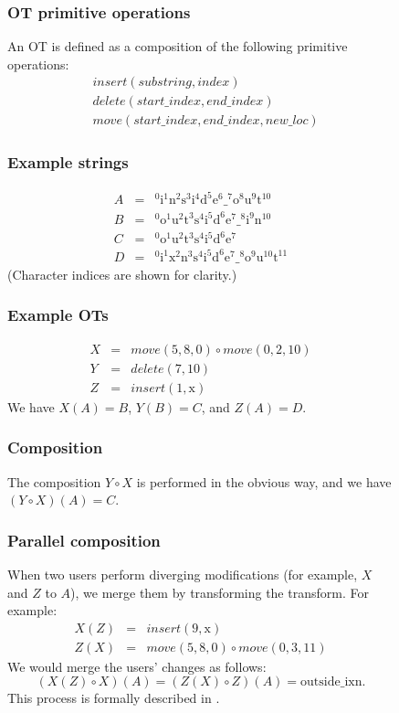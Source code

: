 \documentclass[11pt,titlepage]{article}
\begin{document}
\begin{figure}[h]
  \centering
  \begin{minipage}{\textwidth}
    \begin{multicols}{2}
      \setlength{\parskip}{-6pt}
      \subsubsection*{OT primitive operations}
      An OT is defined as a composition of the following primitive
      operations:
      \begin{eqnarray*}
        &insert(substring, index) \\
        &delete(start\_index, end\_index) \\
        &move(start\_index, end\_index, new\_loc)
      \end{eqnarray*}      
      \subsubsection*{Example strings}
      \begin{eqnarray*}
        A &=& \mathrm{^0i^1n^2s^3i^4d^5e^6\_^7o^8u^9t^{10}} \\
        B &=& \mathrm{^0o^1u^2t^3s^4i^5d^6e^7\_^8i^9n^{10}} \\
        C &=& \mathrm{^0o^1u^2t^3s^4i^5d^6e^7} \\
        D &=& \mathrm{^0i^1x^2n^3s^4i^5d^6e^7\_^8o^9u^{10}t^{11}}
      \end{eqnarray*}
      (Character indices are shown for clarity.)
      \subsubsection*{Example OTs}
      \begin{eqnarray*}
        X &=& move(5, 8, 0) \circ move(0, 2, 10) \\
        Y &=& delete(7, 10) \\
        Z &=& insert(1, \mathrm{x})
      \end{eqnarray*}
      We have \(X(A) = B\), \(Y(B) = C\), and \(Z(A) = D\).
      \subsubsection*{Composition}
      The composition \(Y \circ X\) is performed in the obvious way,
      and we have \((Y \circ X)(A) = C\).
      \subsubsection*{Parallel composition}
      When two users perform diverging modifications (for example,
      \(X\) and \(Z\) to \(A\)), we merge them by transforming the
      transform.  For example:
      \begin{eqnarray*}
        X(Z) &=& insert(9, \mathrm{x}) \\
        Z(X) &=& move(5, 8, 0) \circ move(0, 3, 11)
      \end{eqnarray*}
      We would merge the users' changes as follows: \[(X(Z) \circ
      X)(A) = (Z(X) \circ Z)(A) = \mathrm{outside\_ixn}.\]
      This process is formally described in \cite{ot}.

\end{multicols}
\end{minipage}
\end{figure}
\end{document}
